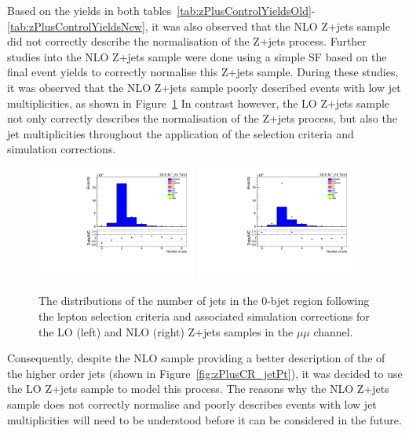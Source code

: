 Based on the yields in both tables~\ref{tab:zPlusControlYieldsOld}-\ref{tab:zPlusControlYieldsNew}, it was also observed that the NLO Z+jets sample did not correctly describe the normalisation of the Z+jets process.
Further studies into the NLO Z+jets sample were done using a simple SF based on the final event yields to correctly normalise this Z+jets sample.
During these studies, it was observed that the NLO Z+jets sample poorly described events with low jet multiplicities, as shown in Figure~\ref{fig:zPlusCR_nJets}
In contrast however, the LO Z+jets sample not only correctly describes the normalisation of the Z+jets process, but also the jet multiplicities throughout the application of the selection criteria and simulation corrections.

\begin{figure}[tbp]
\centering
\includegraphics[width=0.47\textwidth]{figs/background-estimation/plots/unblinded/DY_control_old_prompt_mumu_ttbarInc/numbJets_SingleTop_lepSel_mumu.pdf}
\includegraphics[width=0.47\textwidth]{figs/background-estimation/plots/unblinded/DY_control_old_prompt_mumu_DYamcatnlo/numbJets_SingleTop_lepSel_mumu.pdf}
\caption{
The distributions of the number of jets in the 0-bjet region following the lepton selection criteria and associated simulation corrections for the LO (left) and NLO (right) Z+jets samples in the $\mu\mu$ channel.
}
\label{fig:zPlusCR_nJets}
\end{figure}

Consequently, despite the NLO sample providing a better description of the \pT of the higher order jets (shown in Figure~\ref{fig:zPlusCR_jetPt}), it was decided to use the LO Z+jets sample to model this process.
The reasons why the NLO Z+jets sample does not correctly normalise and poorly describes events with low jet multiplicities will need to be understood before it can be considered in the future.


